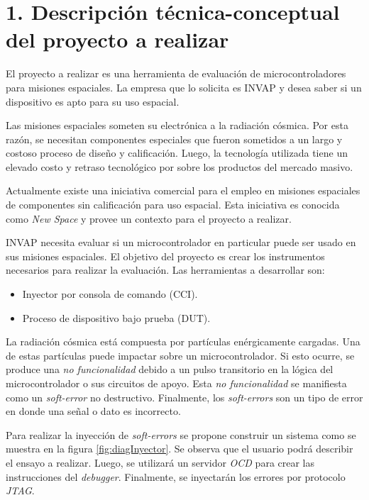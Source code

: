 \documentclass[
11pt, %
]{charter}
\begin{document}
\section{1. Descripción técnica-conceptual del proyecto a realizar}
\label{sec:descripcion}

El proyecto a realizar es una herramienta de evaluación de microcontroladores para misiones espaciales.
La empresa que lo solicita es INVAP y desea saber si un dispositivo es apto para su uso espacial.

Las misiones espaciales someten su electrónica a la radiación cósmica.
Por esta razón, se necesitan componentes especiales que fueron sometidos a un largo y costoso proceso de diseño y calificación.
Luego, la tecnología utilizada tiene un elevado costo y retraso tecnológico por sobre los productos del mercado masivo.

Actualmente existe una iniciativa comercial para el empleo en misiones espaciales de componentes sin calificación para uso espacial.
Esta iniciativa es conocida como \emph{New Space} y provee un contexto para el proyecto a realizar.

INVAP necesita evaluar si un microcontrolador en particular puede ser usado en sus misiones espaciales.
El objetivo del proyecto es crear los instrumentos necesarios para realizar la evaluación.
Las herramientas a desarrollar son:

\begin{itemize}
	\item Inyector por consola de comando (CCI).
	\item Proceso de dispositivo bajo prueba (DUT).
\end{itemize}

La radiación cósmica está compuesta por partículas enérgicamente cargadas.
Una de estas partículas puede impactar sobre un microcontrolador.
Si esto ocurre, se produce una \emph{no funcionalidad} debido a un pulso transitorio en la lógica del microcontrolador o sus circuitos de apoyo.
Esta \emph{no funcionalidad} se manifiesta como un \emph{soft-error} no destructivo.
Finalmente, los \emph{soft-errors} son un tipo de error en donde una señal o dato es incorrecto.

Para realizar la inyección de \emph{soft-errors} se propone construir un sistema como se muestra en la figura \ref{fig:diagInyector}.
Se observa que el usuario podrá describir el ensayo a realizar.
Luego, se utilizará un servidor \emph{OCD} para crear las instrucciones del \emph{debugger}.
Finalmente, se inyectarán los errores por protocolo \emph{JTAG}.
\end{document}
